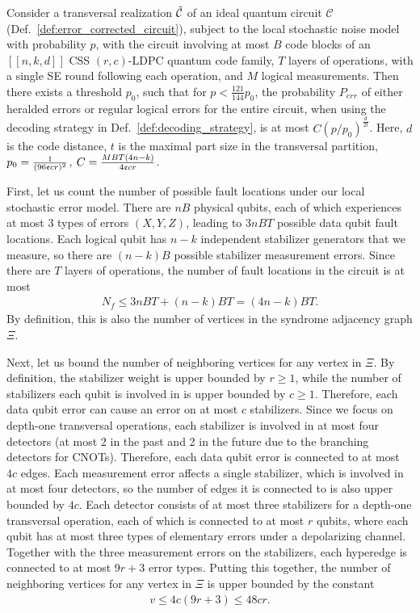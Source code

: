 \begin{thm}
Consider a transversal realization $\tilde{\mathcal{C}}$ of an ideal quantum circuit $\mathcal{C}$ (Def.~\ref{def:error_corrected_circuit}),  subject to the local stochastic noise model with probability $p$, with the circuit involving at most $B$ code blocks of an $[[n,k,d]]$ CSS $(r,c)$-LDPC quantum code family, $T$ layers of operations, with a single SE round following each operation, and $M$ logical measurements.
%
Then there exists a threshold $p_0$, such that for $p<\frac{121}{144}p_0$, the probability $P_{err}$ of either heralded errors or regular logical errors for the entire circuit, when using the decoding strategy in Def.~\ref{def:decoding_strategy}, is at most $C(p/p_0)^{\frac{d}{2t}}$.
%
Here, $d$ is the code distance, $t$ is the maximal part size in the transversal partition, $p_0=\frac{1}{(96\mathfrak{e} cr)^2}$, $C=\frac{MBT(4n-k)}{4\mathfrak{e} cr}$.
\end{thm}

First, let us count the number of possible fault locations under our local stochastic error model.
%
There are $nB$ physical qubits, each of which experiences at most 3 types of errors $(X,Y,Z)$, leading to $3nBT$ possible data qubit fault locations.
%
Each logical qubit has $n-k$ independent stabilizer generators that we measure, so there are $(n-k)B$ possible stabilizer measurement errors.
%
Since there are $T$ layers of operations, the number of fault locations in the circuit is at most
\begin{align}
N_f\leq 3nBT+(n-k)BT=(4n-k)BT.
\end{align}
By definition, this is also the number of vertices in the syndrome adjacency graph $\Xi$.

Next, let us bound the number of neighboring vertices for any vertex in $\Xi$.
%
By definition, the stabilizer weight is upper bounded by $r\geq 1$, while the number of stabilizers each qubit is involved in is upper bounded by $c\geq 1$.
%
Therefore, each data qubit error can cause an error on at most $c$ stabilizers.
%
Since we focus on depth-one transversal operations, each stabilizer is involved in at most four detectors (at most 2 in the past and 2 in the future due to the branching detectors for CNOTs).
%
Therefore, each data qubit error is connected to at most $4c$ edges.
%
Each measurement error affects a single stabilizer, which is involved in at most four detectors, so the number of edges it is connected to is also upper bounded by $4c$.
%
Each detector consists of at most three stabilizers for a depth-one transversal operation, each of which is connected to at most $r$ qubits, where each qubit has at most three types of elementary errors under a depolarizing channel.
%
Together with the three measurement errors on the stabilizers, each hyperedge is connected to at most $9r+3$ error types.
%
Putting this together, the number of neighboring vertices for any vertex in $\Xi$ is upper bounded by the constant
\begin{align}
v\leq 4c(9r+3)\leq 48cr.
\end{align}

